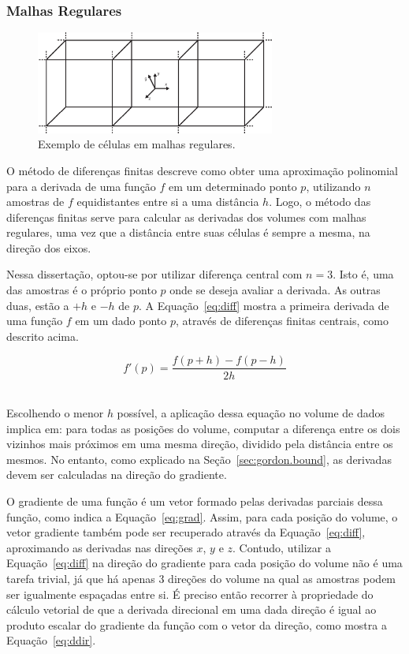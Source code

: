 \subsubsection{Malhas Regulares}
\label{subsec:my.struct}

\begin{figure}[h]
	\centering
	\includegraphics[width=0.7\textwidth]{images/m_regular_cells}
	\caption{Exemplo de células em malhas regulares.}
	\label{fig:m_regular_cells}
\end{figure}

	O método de diferenças finitas descreve como obter uma aproximação polinomial para a derivada de uma função $ f $ em um determinado ponto $ p $, utilizando $ n $ amostras de $ f $ equidistantes entre si a uma distância $ h $. Logo, o método das diferenças finitas serve para calcular as derivadas dos volumes com malhas regulares, uma vez que a distância entre suas células é sempre a mesma, na direção dos eixos.
	
	Nessa dissertação, optou-se por utilizar diferença central com $ n = 3 $. Isto é, uma das amostras é o próprio ponto $ p $ onde se deseja avaliar a derivada. As outras duas, estão a $ +h $ e $ -h $ de $ p $. A Equação~\eqref{eq:diff} mostra a primeira derivada de uma função $ f $ em um dado ponto $ p $, através de diferenças finitas centrais, como descrito acima.
	
\begin{equation}\label{eq:diff}
	f'(p) = \frac{f(p + h) - f(p - h)}{2h}
\end{equation} \

	Escolhendo o menor $ h $ possível, a aplicação dessa equação no volume de dados implica em: para todas as posições do volume, computar a diferença entre os dois vizinhos mais próximos em uma mesma direção, dividido pela distância entre os mesmos. No entanto, como explicado na Seção~\ref{sec:gordon.bound}, as derivadas devem ser calculadas na direção do gradiente.
	
	O gradiente de uma função é um vetor formado pelas derivadas parciais dessa função, como indica a Equação~\eqref{eq:grad}. Assim, para cada posição do volume, o vetor gradiente também pode ser recuperado através da Equação~\eqref{eq:diff}, aproximando as derivadas nas direções $ x $, $ y $ e $ z $. Contudo, utilizar a Equação~\eqref{eq:diff} na direção do gradiente para cada posição do volume não é uma tarefa trivial, já que há apenas 3 direções do volume na qual as amostras podem ser igualmente espaçadas entre si. É preciso então recorrer à propriedade do cálculo vetorial de que a derivada direcional em uma dada direção é igual ao produto escalar do gradiente da função com o vetor da direção, como mostra a Equação~\eqref{eq:ddir}.
	
